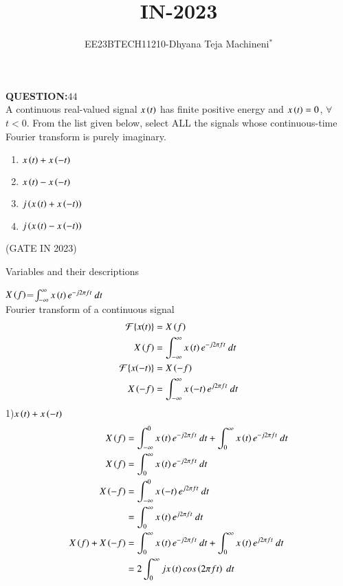 \documentclass[journal,12pt,twocolumn]{IEEEtran}
\theoremstyle{remark}
\begin{document}

\vspace{3cm}
\title{\textbf{IN-2023}}
\author{EE23BTECH11210-Dhyana Teja Machineni$^{*}$%
}
\maketitle
\newpage
\bigskip

\textbf{QUESTION:$44$}\\
A continuous real-valued signal $x\left(t\right)$ has finite positive energy and $x\left(t\right) = 0$, $\forall$ $t < 0$. From the list given below, select ALL the signals whose
continuous-time Fourier transform is purely imaginary.\\
\begin{enumerate}
\item$x\left(t\right) + x\left(-t\right)$
\item$x\left(t\right) - x\left(-t\right)$
\item$j\left(x\left(t\right) + x\left(-t\right)\right)$
\item$j\left(x\left(t\right) - x\left(-t\right)\right)$
\end{enumerate}
\hfill{(GATE IN 2023)}\\
\solution
\begin{table}[h]
         \label{tab:table}
         
         \caption{Variables and their descriptions}
     \end{table}
$X\left(f\right)$=$\int_{-\infty}^{\infty} x\brak{t} e^{-j2 \pi ft} \ dt$\\
Fourier transform of a continuous signal
\begin{align}
\mathcal{F}\{x(t)\} &= X\brak{f}\\
   X\brak{f}&=\int_{-\infty}^{\infty} x\brak{t} e^{-j2 \pi ft} \ dt\\
\mathcal{F}\{x(-t)\} &= X\brak{-f}\\
   X\brak{-f}&=\int_{-\infty}^{\infty} x\brak{-t} e^{j2 \pi ft} \ dt\\
\end{align}    
1)$x\left(t\right) + x\left(-t\right)$
\begin{align}
   X\brak{f}&=\int_{-\infty}^{0}x\brak{t} e^{-j2 \pi ft} \ dt+\int_{0}^{\infty}x\brak{t} e^{-j2 \pi ft} \ dt\\
   X\brak{f}&= \int_{0}^{\infty}x\brak{t} e^{-j2 \pi ft} \ dt\\
   X\brak{-f}&= \int_{-\infty}^{0}x\brak{-t} e^{j2 \pi ft} \ dt\\
 &=\int_{0}^{\infty}x\brak{t} e^{j2 \pi ft} \ dt\\
 X\brak{f}+X\brak{-f}&= \int_{0}^{\infty}x\brak{t} e^{-j2 \pi ft} \ dt+\int_{0}^{\infty}x\brak{t} e^{j2 \pi ft} \ dt\\
 &=2 \int_{0}^{\infty}j x\brak{t} cos\brak{2 \pi ft} \ dt
\end{align}
\end{document}

